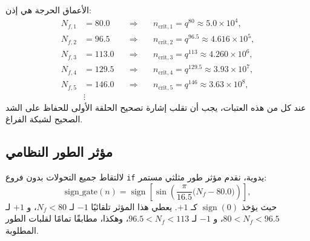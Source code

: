 \documentclass[11pt,a4paper]{article}
\begin{document}
	الأعماق الحرجة هي إذن:
	\begin{align}
		N_{f,1} &= 80.0 \quad &\Longrightarrow&\quad n_{\mathrm{crit},1} = q^{80} \approx 5.0\times10^4, \\
		N_{f,2} &= 96.5 \quad &\Longrightarrow&\quad n_{\mathrm{crit},2} = q^{96.5} \approx 4.616\times10^5, \\
		N_{f,3} &= 113.0 \quad &\Longrightarrow&\quad n_{\mathrm{crit},3} = q^{113} \approx 4.260\times10^6, \\
		N_{f,4} &= 129.5 \quad &\Longrightarrow&\quad n_{\mathrm{crit},4} = q^{129.5} \approx 3.93\times10^7, \\
		N_{f,5} &= 146.0 \quad &\Longrightarrow&\quad n_{\mathrm{crit},5} = q^{146} \approx 3.63\times10^8, \\
		&\vdots & &
	\end{align}
	عند كل من هذه العتبات، يجب أن تقلب إشارة تصحيح الحلقة الأولى للحفاظ على الشد الصحيح لشبكة الفراغ.
	
	\subsection{مؤثر الطور النظامي}
	لالتقاط جميع التحولات بدون فروع \texttt{if} يدوية، نقدم مؤثر طور مثلثي مستمر:
	\begin{equation}
		\boxed{\mathrm{sign\_gate}(n) = \operatorname{sign}\!\left[\sin\!\left(\frac{\pi}{16.5}\bigl(N_f - 80.0\bigr)\right)\right]},
		\label{eq:phaseoperator}
	\end{equation}
	حيث يؤخذ $\operatorname{sign}(0)$ كـ $+1$. يعطي هذا المؤثر تلقائيًا $-1$ لـ $N_f<80$، و $+1$ لـ $80 < N_f < 96.5$، و $-1$ لـ $96.5 < N_f < 113$، وهكذا، مطابقًا تمامًا لقلبات الطور المطلوبة.
	
\end{document}
